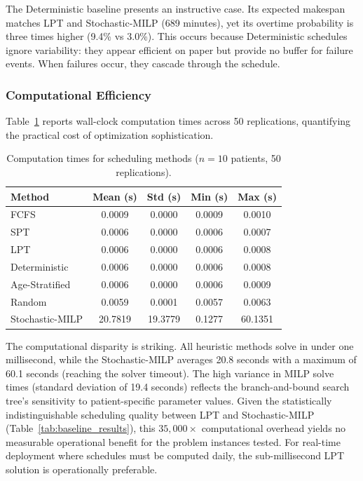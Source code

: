 \documentclass[11pt,a4paper]{article}
\begin{document}
The Deterministic baseline presents an instructive case. Its expected makespan matches LPT and Stochastic-MILP (689 minutes), yet its overtime probability is three times higher (9.4\% vs 3.0\%). This occurs because Deterministic schedules ignore variability: they appear efficient on paper but provide no buffer for failure events. When failures occur, they cascade through the schedule.

\subsubsection{Computational Efficiency}

Table~\ref{tab:computation_times} reports wall-clock computation times across 50 replications, quantifying the practical cost of optimization sophistication.

\begin{table}[H]
\centering
\caption{Computation times for scheduling methods ($n = 10$ patients, 50 replications).}
\label{tab:computation_times}
\begin{tabular}{lcccc}
\toprule
Method & Mean (s) & Std (s) & Min (s) & Max (s) \\
\midrule
FCFS & 0.0009 & 0.0000 & 0.0009 & 0.0010 \\
SPT & 0.0006 & 0.0000 & 0.0006 & 0.0007 \\
LPT & 0.0006 & 0.0000 & 0.0006 & 0.0008 \\
Deterministic & 0.0006 & 0.0000 & 0.0006 & 0.0008 \\
Age-Stratified & 0.0006 & 0.0000 & 0.0006 & 0.0009 \\
Random & 0.0059 & 0.0001 & 0.0057 & 0.0063 \\
Stochastic-MILP & 20.7819 & 19.3779 & 0.1277 & 60.1351 \\
\bottomrule
\end{tabular}
\end{table}

The computational disparity is striking. All heuristic methods solve in under one millisecond, while the Stochastic-MILP averages 20.8 seconds with a maximum of 60.1 seconds (reaching the solver timeout). The high variance in MILP solve times (standard deviation of 19.4 seconds) reflects the branch-and-bound search tree's sensitivity to patient-specific parameter values. Given the statistically indistinguishable scheduling quality between LPT and Stochastic-MILP (Table~\ref{tab:baseline_results}), this $35{,}000\times$ computational overhead yields no measurable operational benefit for the problem instances tested. For real-time deployment where schedules must be computed daily, the sub-millisecond LPT solution is operationally preferable.
\end{document}
